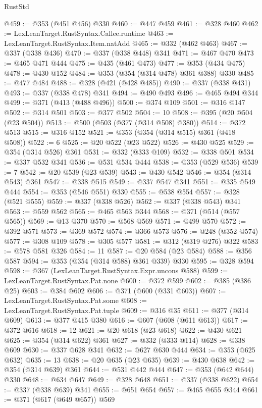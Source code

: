 \begin{lexlean}{RustStd}
\begin{coremodule}
@459 := @353 (@451 @456) @330
@460 := @447 @459
@461 := @328 @460
@462 := LexLeanTarget.RustSyntax.Callee.runtime
@463 := LexLeanTarget.RustSyntax.Item.natAdd
@465 := @332 (@462 @463)
@467 := @337 (@338 @436)
@470 := @337 (@338 @448) @341
@471 := @467 @470
@473 := @465 @471 @444
@475 := @435 (@461 @473)
@477 := @353 (@434 @475)
@478 := @430 @152
@484 := @353 (@354 (@314 @478) @361 @388) @330
@485 := @477 @484
@488 := @328 (@421 (@428 @485))
@490 := @337 (@338 @431)
@493 := @337 (@338 @478) @341
@494 := @490 @493
@496 := @465 @494 @344
@499 := @371 (@413 (@488 @496))
@500 := @374 @109
@501 := @316 @147
@502 := @314 @501
@503 := @377 @502
@504 := 10
@508 := @395 (@20 @504 (@23 @504))
@513 := @500 (@503 (@377 (@314 @508) @380))
@514 := @372 @513
@515 := @316 @152
@521 := @353 (@354 (@314 @515) @361 (@418 @508))
@522 := 6
@525 := @20 @522 (@23 @522)
@526 := @430 @525
@529 := @354 (@314 @526) @361
@531 := @332 (@333 @109)
@532 := @338 @501
@534 := @337 @532 @341
@536 := @531 @534 @444
@538 := @353 (@529 @536)
@539 := 7
@542 := @20 @539 (@23 @539)
@543 := @430 @542
@546 := @354 (@314 @543) @361
@547 := @338 @515
@549 := @337 @547 @341
@551 := @335 @549 @444
@554 := @353 (@546 @551) @330
@555 := @538 @554
@557 := @328 (@521 @555)
@559 := @337 (@338 @526)
@562 := @337 (@338 @543) @341
@563 := @559 @562
@565 := @465 @563 @344
@568 := @371 (@514 (@557 @565))
@569 := @13 @370
@570 := @568 @569
@571 := @499 @570
@572 := @392 @571
@573 := @369 @572
@574 := @366 @573
@576 := @248 (@352 @574)
@577 := @308 @109
@578 := @305 @577
@581 := @312 (@319 @276) @322
@583 := @578 @581 @326
@584 := 11
@587 := @20 @584 (@23 @584)
@588 := @356 @587
@594 := @353 (@354 (@314 @588) @361 @339) @330
@595 := @328 @594
@598 := @367 (LexLeanTarget.RustSyntax.Expr.uncons @588)
@599 := LexLeanTarget.RustSyntax.Pat.none
@600 := @372 @599
@602 := @385 (@386 @25)
@603 := @384 @602
@606 := @371 (@600 (@331 @603))
@607 := LexLeanTarget.RustSyntax.Pat.some
@608 := LexLeanTarget.RustSyntax.Pat.tuple
@609 := @316 @35
@611 := @377 (@314 @609)
@613 := @377 @415 @380
@616 := @607 (@608 (@611 @613))
@617 := @372 @616
@618 := 12
@621 := @20 @618 (@23 @618)
@622 := @430 @621
@625 := @354 (@314 @622) @361
@627 := @332 (@333 @114)
@628 := @338 @609
@630 := @337 @628 @341
@632 := @627 @630 @444
@634 := @353 (@625 @632)
@635 := 13
@638 := @20 @635 (@23 @635)
@639 := @430 @638
@642 := @354 (@314 @639) @361
@644 := @531 @442 @444
@647 := @353 (@642 @644) @330
@648 := @634 @647
@649 := @328 @648
@651 := @337 (@338 @622)
@654 := @337 (@338 @639) @341
@655 := @651 @654
@657 := @465 @655 @344
@661 := @371 (@617 (@649 @657)) @569

\end{coremodule}
\end{lexlean}
